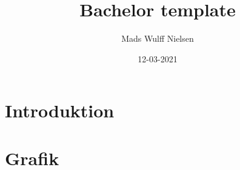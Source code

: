 \documentclass{article}
\title{Bachelor template}
\date{12-03-2021}
\author{Mads Wulff Nielsen}
\begin{document}
    \maketitle
    \thispagestyle{empty}
\newpage
    \tableofcontents
    \thispagestyle{empty}
\newpage
\section{Introduktion}
    \section{Grafik}
    
\end{document}
